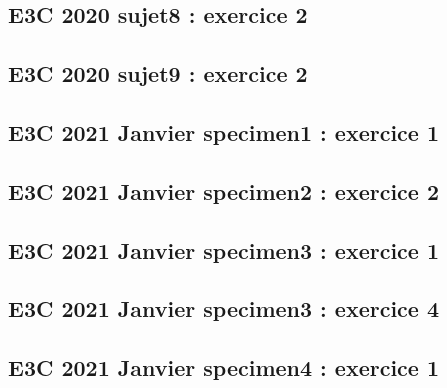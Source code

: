 \documentclass[lang=fr,edition=teacher,layout=sheet]{mxbook}
\begin{document}
\begingroup\endgroup
\par\bigskip
{}\subsection*{E3C 2020 sujet8 : exercice 2}
\begingroup\endgroup
\par\bigskip
{}\subsection*{E3C 2020 sujet9 : exercice 2}
\begingroup\endgroup
\par\bigskip
{}\subsection*{E3C 2021 Janvier specimen1 : exercice 1}
\begingroup\endgroup
\par\bigskip
{}\subsection*{E3C 2021 Janvier specimen2 : exercice 2}
\begingroup\endgroup
\par\bigskip
{}\subsection*{E3C 2021 Janvier specimen3 : exercice 1}
\begingroup\endgroup
\par\bigskip
{}\subsection*{E3C 2021 Janvier specimen3 : exercice 4}
\begingroup\endgroup
\par\bigskip
{}\subsection*{E3C 2021 Janvier specimen4 : exercice 1}
\end{document}
